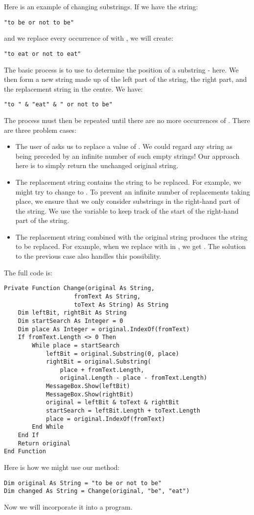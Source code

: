 		Here is an example of changing substrings. If we have the string:
		\begin{lstlisting}
"to be or not to be"
		\end{lstlisting}
		and we replace every occurrence of  with , we will create:
		\begin{lstlisting}
"to eat or not to eat"
		\end{lstlisting}
		The basic process is to use  to determine the position of a substring -  here. We then form a new string made up of the left part of the string, the right part, and the replacement string in the centre. We have:
		\begin{lstlisting}
"to " & "eat" & " or not to be"
		\end{lstlisting}
		The process must then be repeated until there are no more occurrences of . There are three problem cases:
		\begin{itemize}
			\item The user of  asks us to replace a value of . We could regard any string as being preceded by an infinite number of such empty strings! Our approach here is to simply return the unchanged original string.
			\item The replacement string contains the string to be replaced. For example, we might try to change  to . To prevent an infinite number of replacements taking place, we ensure that we only consider substrings in the right-hand part of the string. We use the variable  to keep track of the start of the right-hand part of the string.
			\item The replacement string combined with the original string produces the string to be replaced. For example, when we replace  with  in , we get . The solution to the previous case also handles this possibility.
		\end{itemize}
		The full code is:
		\begin{lstlisting}
Private Function Change(original As String,
					fromText As String,
					toText As String) As String
	Dim leftBit, rightBit As String
	Dim startSearch As Integer = 0
	Dim place As Integer = original.IndexOf(fromText)
	If fromText.Length <> 0 Then
		While place = startSearch
			leftBit = original.Substring(0, place)
			rightBit = original.Substring(
				place + fromText.Length,
				original.Length - place - fromText.Length)
			MessageBox.Show(leftBit)
			MessageBox.Show(rightBit)
			original = leftBit & toText & rightBit
			startSearch = leftBit.Length + toText.Length
			place = original.IndexOf(fromText)
		End While
	End If
	Return original
End Function
		\end{lstlisting}
		Here is how we might use our method:
		\begin{lstlisting}
Dim original As String = "to be or not to be"
Dim changed As String = Change(original, "be", "eat")
		\end{lstlisting}
		Now we will incorporate it into a program.


